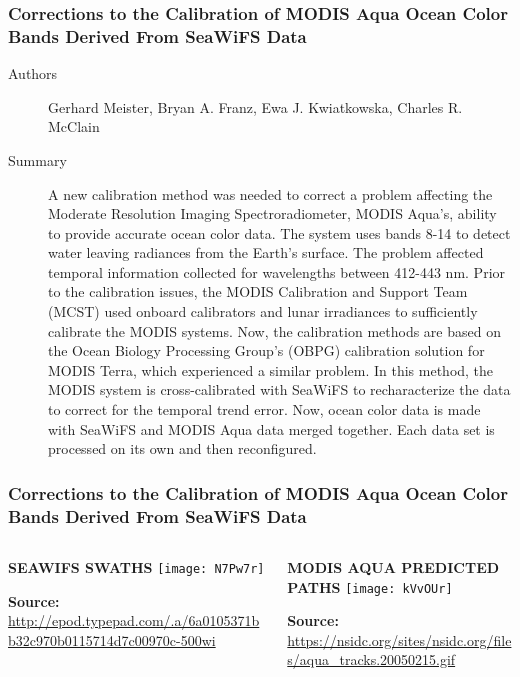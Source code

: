 \begin{frame}\frametitle{Corrections to the Calibration of MODIS Aqua Ocean Color Bands Derived From SeaWiFS Data} 
\begin{description}
    \item[Authors] Gerhard Meister, Bryan A. Franz, Ewa J. Kwiatkowska, Charles R. McClain
    \item[Summary] \scriptsize A new calibration method was needed to correct a problem affecting the Moderate Resolution Imaging Spectroradiometer, MODIS Aqua’s, ability to provide accurate ocean color data. The system uses bands 8-14 to detect water leaving radiances from the Earth’s surface. The problem affected temporal information collected for wavelengths between 412-443 nm. Prior to the calibration issues, the MODIS Calibration and Support Team (MCST) used onboard calibrators and lunar irradiances to sufficiently calibrate the MODIS systems. Now, the calibration methods are based on the Ocean Biology Processing Group’s (OBPG) calibration solution for MODIS Terra, which experienced a similar problem. In this method, the MODIS system is cross-calibrated with SeaWiFS to recharacterize the data to correct for the temporal trend error. Now, ocean color data is made with SeaWiFS and MODIS Aqua data merged together. Each data set is processed on its own and then reconfigured.
\end{description}

\end{frame}

\begin{frame}\frametitle{Corrections to the Calibration of MODIS Aqua Ocean Color Bands Derived From SeaWiFS Data} 


\begin{columns}
\begin{column}{0.5\textwidth}
    \begin{center}
    \textbf{\scriptsize SEAWIFS SWATHS}
    \texttt{[image: N7Pw7r]}

    \tiny \textbf{Source:} \url{http://epod.typepad.com/.a/6a0105371bb32c970b0115714d7c00970c-500wi}
    \end{center}
\end{column}
\begin{column}{0.5\textwidth}  %
    \begin{center}
    \textbf{\scriptsize MODIS AQUA PREDICTED PATHS}
    \texttt{[image: kVvOUr]}

    \tiny \textbf{Source:} \url{https://nsidc.org/sites/nsidc.org/files/aqua_tracks.20050215.gif}
    \end{center}
\end{column}
\end{columns}

\end{frame}
